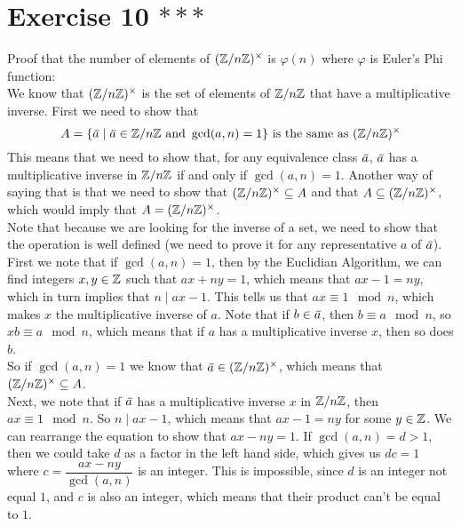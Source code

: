 \documentclass[12pt]{article}
\begin{document}
    \section*{Exercise 10 $***$}
    Proof that the number of elements of $(\mathbb{Z}/n\mathbb{Z})^\times$
    is $\varphi(n)$ where $\varphi$ is Euler's Phi function: \\
    We know that $(\mathbb{Z}/n\mathbb{Z})^\times$ is the set of elements of $\mathbb{Z}/n\mathbb{Z}$
    that have a multiplicative inverse.
    First we need to show that 
    \[ A = \{ \,\overline{\!{a}} \mid \,\overline{\!{a}} \in \mathbb{Z}/n\mathbb{Z}
    \text{ and } \gcd(a, n) = 1 \} 
    \text{ is the same as } (\mathbb{Z}/n\mathbb{Z})^\times \]
    This means that we need to show that,
    for any equivalence class $\,\overline{\!{a}}$,
    $\,\overline{\!{a}}$ has a multiplicative inverse in $\mathbb{Z}/n\mathbb{Z}$
    if and only if $\gcd(a, n) = 1$.
    Another way of saying that is that we need to show
    that $(\mathbb{Z}/n\mathbb{Z})^\times \subseteq A$
    and that $A \subseteq (\mathbb{Z}/n\mathbb{Z})^\times$,
    which would imply that $A = (\mathbb{Z}/n\mathbb{Z})^\times$. \\
    Note that because we are looking for the inverse of a set,
    we need to show that the operation is well defined
    (we need to prove it for any representative $a$ of $\,\overline{\!{a}}$). \\
    First we note that if $\gcd(a, n) = 1$,
    then by the Euclidian Algorithm, we can find integers $x, y \in \mathbb{Z}$
    such that $ax + ny = 1$,
    which means that $ax - 1 = ny$,
    which in turn implies that $n \mid ax - 1$.
    This tells us that $ax \equiv 1 \mod n$,
    which makes $x$ the multiplicative inverse of $a$.
    Note that if $b \in \,\overline{\!{a}}$,
    then $b \equiv a \mod n$,
    so $xb \equiv a \mod n$,
    which means that if $a$ has a multiplicative inverse $x$,
    then so does $b$. \\
    So if $\gcd(a, n) = 1$
    we know that $\,\overline{\!{a}} \in (\mathbb{Z}/n\mathbb{Z})^\times$,
    which means that $(\mathbb{Z}/n\mathbb{Z})^\times \subseteq A$. \\
    Next, we note that if $\,\overline{\!{a}}$ has a multiplicative inverse
    $x$ in $\mathbb{Z}/n\mathbb{Z}$,
    then $ax \equiv 1 \mod n$.
    So $n \mid ax - 1$,
    which means that $ax - 1 = ny$ for some $y \in \mathbb{Z}$.
    We can rearrange the equation to show that $ax - ny = 1$.
    If $\gcd(a, n) = d > 1$,
    then we could take $d$ as a factor in the left hand side,
    which gives us $dc = 1$ where $c = \dfrac{ax - ny}{\gcd(a, n)}$
    is an integer.
    This is impossible,
    since $d$ is an integer not equal $1$,
    and $c$ is also an integer,
    which means that their product can't be equal to $1$.
\end{document}
